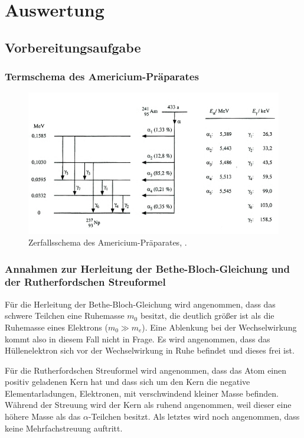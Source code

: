 \section{Auswertung}
\label{sec:Auswertung}
\subsection{Vorbereitungsaufgabe}
\subsubsection{Termschema des Americium-Präparates}
\begin{figure}[h!]
	\centering
	\includegraphics[width=0.9\linewidth]{6362cb7a8529daf05d8e0be425b50d10bacfe0c3}
	\caption{Zerfallsschema des Americium-Präparates, \cite{AmericiumZerfall}.}
	\label{fig:6362cb7a8529daf05d8e0be425b50d10bacfe0c3}
\end{figure}
\subsubsection{Annahmen zur Herleitung der Bethe-Bloch-Gleichung und der Rutherfordschen Streuformel}
Für die Herleitung der Bethe-Bloch-Gleichung wird angenommen, dass das schwere Teilchen eine Ruhemasse $m_0$ besitzt, die deutlich größer ist als die Ruhemasse eines Elektrons ($m_0 \gg m_e$). Eine Ablenkung bei der Wechselwirkung kommt also in diesem Fall nicht in Frage. Es wird angenommen, dass das Hüllenelektron sich vor der Wechselwirkung in Ruhe befindet und dieses frei ist.

Für die Rutherfordschen Streuformel wird angenommen, dass das Atom einen positiv geladenen Kern hat und dass sich um den Kern die negative Elementarladungen, Elektronen, mit verschwindend kleiner Masse befinden. Während der Streuung wird der Kern als ruhend angenommen, weil dieser eine höhere Masse als das $\alpha$-Teilchen besitzt. Als letztes wird noch angenommen, dass keine Mehrfachstreuung auftritt.

